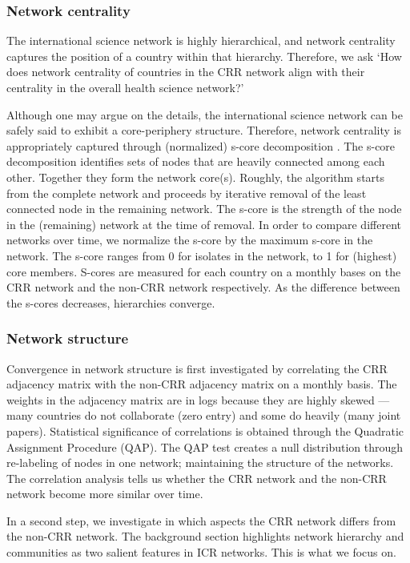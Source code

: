 \subsubsection{Network centrality}

The international science network is highly hierarchical, and network centrality captures the position of a country within that hierarchy. Therefore, we ask `How does network centrality of countries in the CRR network align with their centrality in the overall health science network?'

Although one may argue on the details, the international science network can be safely said to exhibit a core-periphery structure. Therefore, network centrality is appropriately captured through (normalized) s-core decomposition \citep{eidsaa2013s}. The s-core decomposition identifies sets of nodes that are heavily connected among each other. Together they form the network core(s). Roughly, the algorithm starts from the complete network and proceeds by iterative removal of the least connected node in the remaining network. The s-core is the strength of the node in the (remaining) network at the time of removal. In order to compare different networks over time, we normalize the s-core by the maximum s-core in the network. The s-core ranges from 0 for isolates in the network, to 1 for (highest) core members. S-cores are measured for each country on a monthly bases on the CRR network and the non-CRR network respectively. As the difference between the s-cores decreases, hierarchies converge. 

\subsubsection{Network structure}

Convergence in network structure is first investigated by correlating the CRR adjacency matrix with the non-CRR adjacency matrix on a monthly basis. The weights in the adjacency matrix are in logs because they are highly skewed --- many countries do not collaborate (zero entry) and some do heavily (many joint papers). Statistical significance of correlations is obtained through the Quadratic Assignment Procedure (QAP). The QAP test creates a null distribution through re-labeling of nodes in one network; maintaining the structure of the networks. The correlation analysis tells us whether the CRR network and the non-CRR network become more similar over time.  

In a second step, we investigate in which aspects the CRR network differs from the non-CRR network. The background section highlights network hierarchy and communities as two salient features in ICR networks. This is what we focus on. 

